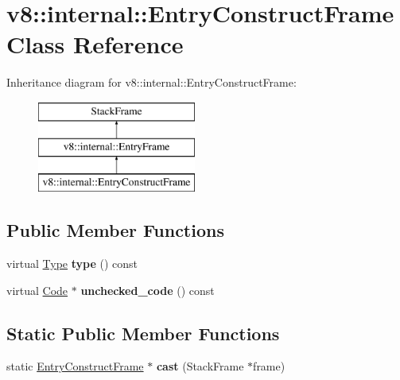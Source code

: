 \hypertarget{classv8_1_1internal_1_1_entry_construct_frame}{}\section{v8\+:\+:internal\+:\+:Entry\+Construct\+Frame Class Reference}
\label{classv8_1_1internal_1_1_entry_construct_frame}
Inheritance diagram for v8\+:\+:internal\+:\+:Entry\+Construct\+Frame\+:\begin{figure}[H]
\begin{center}
\leavevmode
\includegraphics[height=3.000000cm]{classv8_1_1internal_1_1_entry_construct_frame}
\end{center}
\end{figure}
\subsection*{Public Member Functions}
\begin{DoxyCompactItemize}
\item 
\hypertarget{classv8_1_1internal_1_1_entry_construct_frame_a72cc372e3c31dd523756acfbfbe36437}{}virtual \hyperlink{classv8_1_1internal_1_1_type_impl}{Type} {\bfseries type} () const \label{classv8_1_1internal_1_1_entry_construct_frame_a72cc372e3c31dd523756acfbfbe36437}

\item 
\hypertarget{classv8_1_1internal_1_1_entry_construct_frame_a97f39bcc4721f8330c8404c13f35a753}{}virtual \hyperlink{classv8_1_1internal_1_1_code}{Code} $\ast$ {\bfseries unchecked\+\_\+code} () const \label{classv8_1_1internal_1_1_entry_construct_frame_a97f39bcc4721f8330c8404c13f35a753}

\end{DoxyCompactItemize}
\subsection*{Static Public Member Functions}
\begin{DoxyCompactItemize}
\item 
\hypertarget{classv8_1_1internal_1_1_entry_construct_frame_af89d5ce7d4889800e2f5ce7ce015c457}{}static \hyperlink{classv8_1_1internal_1_1_entry_construct_frame}{Entry\+Construct\+Frame} $\ast$ {\bfseries cast} (Stack\+Frame $\ast$frame)\label{classv8_1_1internal_1_1_entry_construct_frame_af89d5ce7d4889800e2f5ce7ce015c457}

\end{DoxyCompactItemize}
